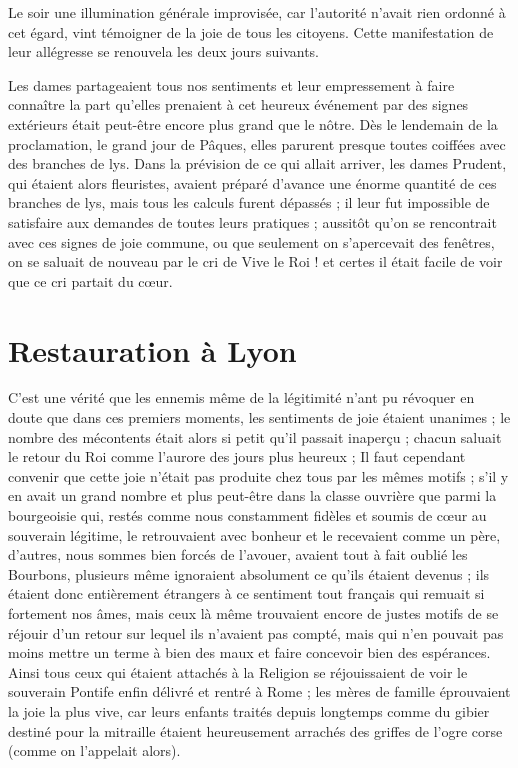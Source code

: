 \documentclass[11pt,a4paper]{report}
\begin{document}
Le soir une illumination générale improvisée, car l'autorité n'avait rien ordonné à cet égard, vint témoigner de la joie de tous les citoyens. Cette manifestation de leur allégresse se renouvela les deux jours suivants.

Les dames partageaient tous nos sentiments et leur empressement à faire connaître la part qu'elles prenaient à cet heureux événement par des signes extérieurs était peut-être encore plus grand que le nôtre. Dès le lendemain de la proclamation, le grand jour de Pâques, elles parurent presque toutes coiffées avec des branches de lys. Dans la prévision de ce qui allait arriver, les dames Prudent, qui étaient alors fleuristes, avaient préparé d'avance une énorme quantité de ces branches de lys, mais tous les calculs furent dépassés ; il leur fut impossible de satisfaire aux demandes de toutes leurs pratiques ; aussitôt qu'on se rencontrait avec ces signes de joie commune, ou que seulement on s'apercevait des fenêtres, on se saluait de nouveau par le cri de Vive le Roi ! et certes il était facile de voir que ce cri partait du cœur.

\section*{Restauration à Lyon}

C'est une vérité que les ennemis même de la légitimité n'ant pu révoquer en doute que dans ces premiers moments, les sentiments de joie étaient unanimes ; le nombre des mécontents était alors si petit qu'il passait inaperçu ; chacun saluait le retour du Roi comme l'aurore des jours plus heureux ; Il faut cependant convenir que cette joie n'était pas produite chez tous par les mêmes motifs ; s'il y en avait un grand nombre et plus peut-être dans la classe ouvrière que parmi la bourgeoisie qui, restés comme nous constamment fidèles et soumis de cœur au souverain légitime, le retrouvaient avec bonheur et le recevaient comme un père, d'autres, nous sommes bien forcés de l'avouer, avaient tout à fait oublié les Bourbons, plusieurs même ignoraient absolument ce qu'ils étaient devenus ; ils étaient donc entièrement étrangers à ce sentiment tout français qui remuait si fortement nos âmes, mais ceux là même trouvaient encore de justes motifs de se réjouir d'un retour sur lequel ils n'avaient pas compté, mais qui n'en pouvait pas moins mettre un terme à bien des maux et faire concevoir bien des espérances. Ainsi tous ceux qui étaient attachés à la Religion se réjouissaient de voir le souverain Pontife enfin délivré et rentré à Rome ; les mères de famille éprouvaient la joie la plus vive, car leurs enfants traités depuis longtemps comme du gibier destiné pour la mitraille étaient heureusement arrachés des griffes de l'ogre corse (comme on l'appelait alors).
\end{document}
